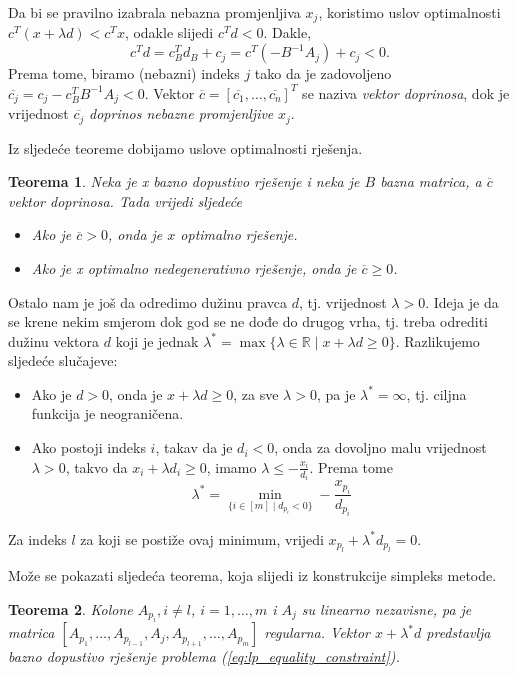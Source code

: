 \documentclass[a4paper, utf8, 11pt, colorlinks]{book}
\newtheorem{thm}{Teorema}[chapter]
\theoremstyle{definition}
\begin{document}
Da bi se pravilno izabrala nebazna promjenljiva $x_j$, koristimo  uslov optimalnosti $c^T ( x + \lambda d ) < c^T x $, odakle slijedi $c^T d < 0$.  Dakle, $$c^T d = c_B^T d_B + c_j = c^T ( - B^{-1} A_j ) + c_j < 0.$$
 Prema tome, biramo (nebazni) indeks $j$ tako da je zadovoljeno $ \overline{c_j} = c_j - c_B^T B^{-1}A_j < 0$. Vektor $\overline{c}=[\overline{c_1}, \ldots, \overline{c_n}]^T$ se naziva \emph{vektor doprinosa}, dok je vrijednost $\overline{c_j}$ \emph{doprinos nebazne promjenljive} $x_j$. 
 
Iz sljedeće teoreme dobijamo uslove optimalnosti rješenja.

\begin{thm}
  Neka je x bazno dopustivo rješenje i neka je $B$ bazna matrica, a $\overline{c}$ vektor doprinosa. Tada vrijedi sljedeće
  \begin{itemize}
      \item Ako je $\overline{c} >0$, onda je $x$ optimalno rješenje.
      \item Ako je x optimalno nedegenerativno rješenje, onda je $\overline{c} \geq 0$.
  \end{itemize}
\end{thm}

Ostalo nam je još da odredimo dužinu   pravca $d$, tj. vrijednost $\lambda>0$. Ideja je da se krene nekim smjerom dok god se ne dođe do drugog vrha, tj. treba odrediti dužinu vektora $d$ koji je jednak $\lambda^* = \max \{ \lambda \in \mathbb{R} \mid x + \lambda d \geq 0 \}$. Razlikujemo sljedeće slučajeve:
\begin{itemize}
    \item Ako je $d >0$, onda je $  x + \lambda d \geq 0$, za sve $\lambda > 0$, pa je $\lambda^* = \infty$, tj. ciljna funkcija je neograničena.
    \item Ako postoji indeks $i$, takav da je $d_i < 0$, onda za dovoljno malu vrijednost $\lambda>0$, takvo da $x_i + \lambda d_i \geq 0$, imamo $\lambda \leq -\frac{x_i}{d_i}$. Prema tome 
    $$ \lambda^* = \min_{ \{i\in [m] \mid d_{p_i} < 0  \}} - \frac{x_{p_i}}{d_{p_i}} $$
\end{itemize}
Za indeks $l$ za koji se postiže ovaj minimum, vrijedi $x_{p_l} + \lambda^* d_{p_l}=0$.

Može se pokazati sljedeća teorema, koja slijedi iz konstrukcije simpleks metode.

\begin{thm}
    Kolone $A_{p_i}, i\not = l$, $i=1,\ldots,m$ i $A_{j}$ su linearno nezavisne, pa je matrica 
    $[A_{p_1},\ldots, A_{p_{l-1}}, A_j, A_{p_{l+1}}, \ldots, A_{p_m}]$
    regularna. Vektor $x + \lambda^* d$ predstavlja bazno dopustivo rješenje problema (\ref{eq:lp_equality_constraint}). 
\end{thm}
\end{document}
